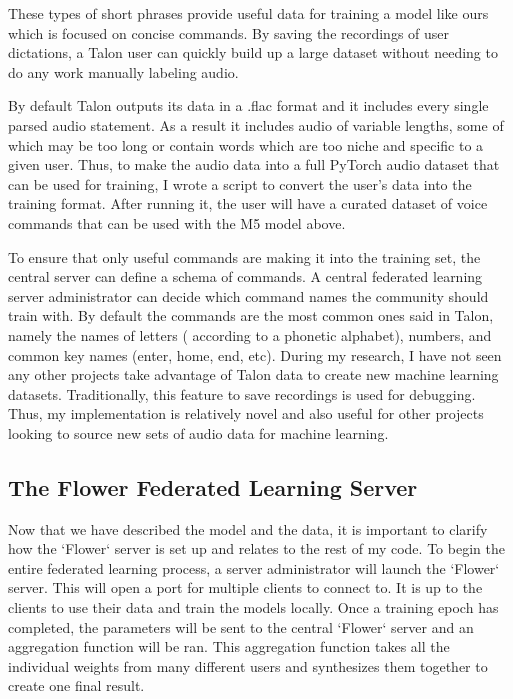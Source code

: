 \documentclass[manuscript,screen,review]{acmart}
\begin{document}
These types of short phrases provide useful data for training a model like ours which is focused on concise commands. By saving the recordings of user dictations, a Talon user can quickly build up a large dataset without needing to do any work manually labeling audio.

By default Talon outputs its data in a .flac format and it includes every single parsed audio statement. As a result it includes audio of variable lengths, some of which may be too long or contain words which are too niche and specific to a given user. Thus, to make the audio data into a full PyTorch audio dataset that can be used for training, I wrote a script to convert the user's data into the training format. After running it, the user will have a curated dataset of voice commands that can be used with the M5 model above. 

To ensure that only useful commands are making it into the training set, the central server can define a schema of commands. A central federated learning server administrator can decide which command names the community should train with. By default the commands are the most common ones said in Talon, namely the names of letters ( according to a phonetic alphabet), numbers, and common key names (enter, home, end, etc). During my research, I have not seen any other projects take advantage of Talon data to create new machine learning datasets. Traditionally, this feature to save recordings is used for debugging. Thus, my implementation is relatively novel and also useful for other projects looking to source new sets of audio data for machine learning.

\subsection{The Flower Federated Learning Server}

Now that we have described the model and the data, it is important to clarify how the `Flower` server is set up and relates to the rest of my code. To begin the entire federated learning process, a server administrator will launch the `Flower` server. This will open a port for multiple clients to connect to. It is up to the clients to use their data and train the models locally. Once a training epoch has completed, the parameters will be sent to the central `Flower` server and an aggregation function will be ran. This aggregation function takes all the individual weights from many different users and synthesizes them together to create one final result.
\end{document}
